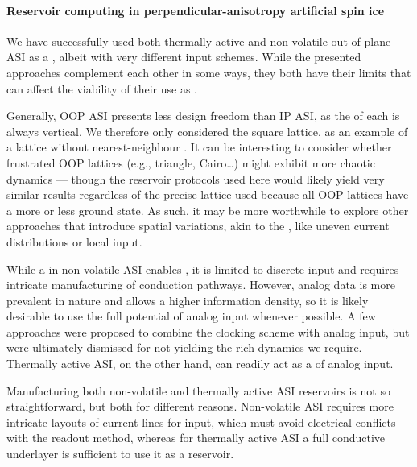 \paragraph{Reservoir computing in perpendicular-anisotropy artificial spin ice}
We have successfully used both thermally active and non-volatile out-of-plane ASI as a , albeit with very different input schemes.
While the presented approaches complement each other in some ways, they both have their limits that can affect the viability of their use as . \\\par

Generally, OOP ASI presents less design freedom than IP ASI, as the  of each  is always vertical.
We therefore only considered the square lattice, as an example of a lattice without nearest-neighbour .
It can be interesting to consider whether frustrated OOP lattices (e.g., triangle, Cairo\dots) might exhibit more chaotic dynamics --- though the reservoir protocols used here would likely yield very similar results regardless of the precise lattice used because all OOP lattices have a more or less  ground state.
As such, it may be more worthwhile to explore other approaches that introduce spatial variations, akin to the , like uneven current distributions or local input. \par
While a  in non-volatile ASI enables , it is limited to discrete input and requires intricate manufacturing of conduction pathways.
However, analog data is more prevalent in nature and allows a higher information density, so it is likely desirable to use the full potential of analog input whenever possible.
A few approaches were proposed to combine the clocking scheme with analog input, but were ultimately dismissed for not yielding the rich dynamics we require.
Thermally active ASI, on the other hand, can readily act as a  of analog input. \par
Manufacturing both non-volatile and thermally active ASI reservoirs is not so straightforward, but both for different reasons.
Non-volatile ASI requires more intricate layouts of current lines for input, which must avoid electrical conflicts with the readout method, whereas for thermally active ASI a full conductive underlayer is sufficient to use it as a reservoir.
